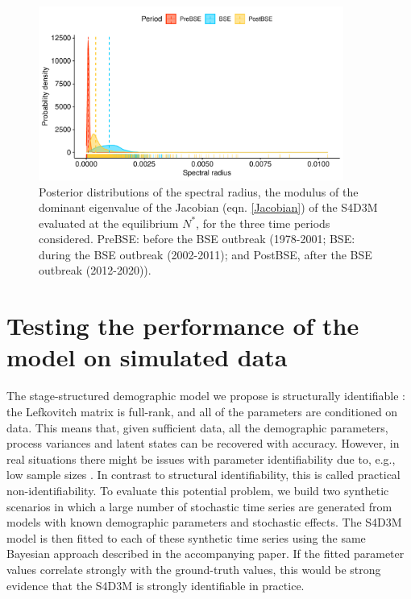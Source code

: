 \documentclass[12pt,a4paper]{article}
\begin{document}
\renewcommand{\thefigure}{S3}
\begin{figure}[htbp]
	\begin{center}
		\includegraphics[width=10cm]{figs/FigS3.pdf}
	\end{center}
	\caption{Posterior distributions of the spectral radius, the modulus of the dominant eigenvalue of the Jacobian (eqn. \ref{Jacobian}) of the S4D3M evaluated at the equilibrium $N^*$, for the three time periods considered. PreBSE: before the BSE outbreak (1978-2001; BSE: during the BSE outbreak (2002-2011); and PostBSE, after the BSE outbreak (2012-2020)).}
	\label{fig:Asympt_resil}
\end{figure}

\section{Testing the performance of the model on simulated data}

The stage-structured demographic model we propose is structurally identifiable \cite{Bellman1970,Cole2020,Villaverde2016}: the Lefkovitch matrix is full-rank, and all of the parameters are conditioned on data. This means that, given sufficient data, all the demographic parameters, process variances and latent states can be recovered with accuracy. However, in real situations there might be issues with parameter identifiability due to, e.g., low sample sizes \cite{Cole2020}. In contrast to structural identifiability, this is called practical non-identifiability. To evaluate this potential problem, we build two synthetic scenarios in which a large number of stochastic time series are generated from models with known demographic parameters and stochastic effects. The S4D3M model is then fitted to each of these synthetic time series using the same Bayesian approach described in the accompanying paper. If the fitted parameter values correlate strongly with the ground-truth values, this would be strong evidence that the S4D3M is strongly identifiable in practice.\\
\end{document}
